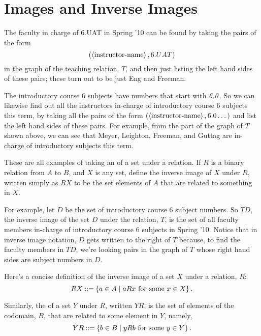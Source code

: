 \section{Images and Inverse Images}


The faculty in charge of 6.UAT in Spring '10 can be found by taking the
pairs of the form
\[
(\left\langle\text{instructor-name}\right\rangle, 6.UAT)
\]
in the graph of the teaching relation, $T$, and then just listing the left
hand sides of these pairs; these turn out to be just Eng and Freeman.

The introductory course 6 subjects have numbers that start with
\emph{6.0}\,.  So we can likewise find out all the instructors in-charge
of introductory course 6 subjects this term, by taking all the pairs of
the form $(\left\langle\text{instructor-name}\right\rangle, 6.0\dots)$ and list the left hand
sides of these pairs.  For example, from the part of the graph of $T$
shown above, we can see that Meyer, Leighton, Freeman, and Guttag are
in-charge of introductory subjects this term.

These are all examples of taking an  of a set under a
relation.  If $R$ is a binary relation from $A$ to $B$, and $X$ is any
set, define the inverse image of $X$ under $R$, written simply as
$RX$ to be the set elements of $A$ that are related to something in $X$.

For example, let $D$ be the set of introductory course 6 subject numbers.
So $TD$, the inverse image of the set $D$ under the relation, $T$, is the
set of all faculty members in-charge of introductory course 6 subjects in
Spring '10.  Notice that in inverse image notation, $D$ gets written to
the right of $T$ because, to find the faculty members in $TD$, we're
looking pairs in the graph of $T$ whose right hand sides are subject
numbers in $D$.

Here's a concise definition of the inverse image of a set $X$ under
a relation, $R$:
\[
RX \mathbin{::=} \left\{a \in A \mid aRx \text{ for some } x \in X\right\}.
\]

Similarly, the  of a set $Y$ under $R$, written $YR$, is the
set of elements of the codomain, $B$, that are related to some element in
$Y$, namely,
\[
YR \mathbin{::=} \left\{b \in B \mid yRb \text{ for some } y \in Y\right\}.
\]

